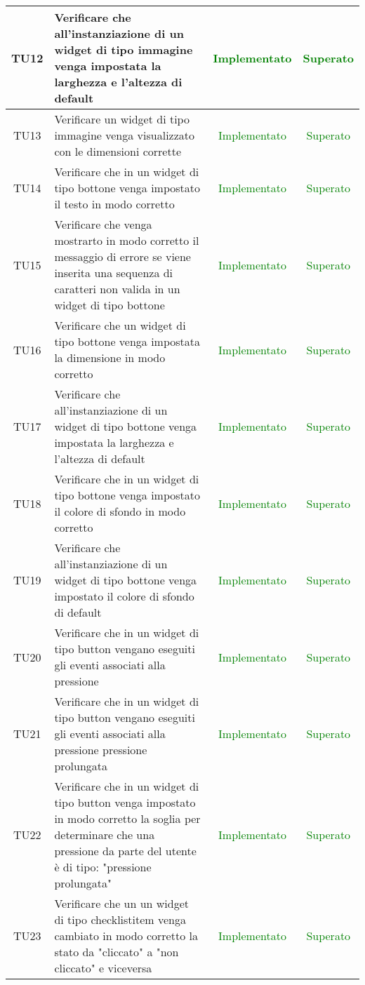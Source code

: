 \begin{center}
\begin{longtable}{|c|>{\centering}m{10cm}|c|c|}
		TU12 & Verificare che all'instanziazione di un widget di tipo immagine venga impostata la larghezza e l'altezza di default & \textcolor{Green}{Implementato} & \textcolor{Green}{Superato} \\ \hline
		TU13 & Verificare un widget di tipo immagine venga visualizzato con le dimensioni corrette & \textcolor{Green}{Implementato} & \textcolor{Green}{Superato} \\ \hline
		TU14 & Verificare che in un widget di tipo bottone venga impostato il testo in modo corretto & \textcolor{Green}{Implementato} & \textcolor{Green}{Superato} \\ \hline
		TU15 & Verificare che venga mostrarto in modo corretto il messaggio di errore se viene inserita una sequenza di caratteri non valida in un widget di tipo bottone & \textcolor{Green}{Implementato} & \textcolor{Green}{Superato} \\ \hline
		TU16 & Verificare che un widget di tipo bottone venga impostata la dimensione in modo corretto & \textcolor{Green}{Implementato} & \textcolor{Green}{Superato} \\ \hline
		TU17 & Verificare che all'instanziazione di un widget di tipo bottone venga impostata la larghezza e l'altezza di default & \textcolor{Green}{Implementato} & \textcolor{Green}{Superato} \\ \hline
		TU18 & Verificare che in un widget di tipo bottone venga impostato il colore di sfondo in modo corretto & \textcolor{Green}{Implementato} & \textcolor{Green}{Superato} \\ \hline
		TU19 & Verificare che all'instanziazione di un widget di tipo bottone venga impostato il colore di sfondo di default & \textcolor{Green}{Implementato} & \textcolor{Green}{Superato} \\ \hline
		TU20 & Verificare che in un widget di tipo button vengano eseguiti gli eventi associati alla pressione & \textcolor{Green}{Implementato} & \textcolor{Green}{Superato} \\ \hline
		TU21 & Verificare che in un widget di tipo button vengano eseguiti gli eventi associati alla pressione pressione prolungata & \textcolor{Green}{Implementato} & \textcolor{Green}{Superato} \\ \hline
		TU22 & Verificare che in un widget di tipo button venga impostato in modo corretto la soglia per determinare che una pressione da parte del utente è di tipo: "pressione prolungata" & \textcolor{Green}{Implementato} & \textcolor{Green}{Superato} \\ \hline
		TU23 & Verificare che un un widget di tipo checklistitem venga cambiato in modo corretto la stato da "cliccato" a "non cliccato" e viceversa & \textcolor{Green}{Implementato} & \textcolor{Green}{Superato} \\ \hline

\end{longtable}
\end{center}
